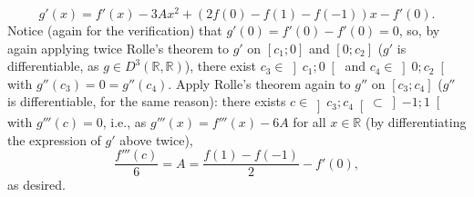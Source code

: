 \begin{solution}
    \[
        g'\left(x\right) = f'\left(x\right)-3Ax^2+\left(2f\left(0\right)-f\left(1\right)-f\left(-1\right)\right)x-f'\left(0\right).
    \]
    Notice (again for the verification) that \( g'\left(0\right) = f'\left(0\right)-f'\left(0\right) = 0 \), so, by again applying twice Rolle's theorem to \( g' \) on \( \left[c_1;0\right] \) and \( \left[0;c_2\right] \) (\( g' \) is differentiable, as \( g \in D^3\left(\mathbb{R},\mathbb{R}\right) \)), there exist \( c_3 \in \left]c_1;0\right[ \) and \( c_4 \in \left]0;c_2\right[ \) with \( g''\left(c_3\right) = 0 = g''\left(c_4\right) \). Apply Rolle's theorem again to \( g'' \) on \( \left[c_3;c_4\right] \) (\( g'' \) is differentiable, for the same reason): there exists \( c \in \left]c_3;c_4\right[ \subset \left]-1;1\right[ \) with \( g'''\left(c\right) = 0 \), i.e., as \( g'''\left(x\right) = f'''\left(x\right)-6A \) for all \( x \in \mathbb{R} \) (by differentiating the expression of \( g' \) above twice),
    \[
        \frac{f'''\left(c\right)}{6} = A = \frac{f\left(1\right)-f\left(-1\right)}{2}-f'\left(0\right),
    \]
    as desired.
\end{solution}
